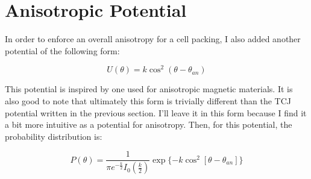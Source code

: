 \documentclass[12pt]{article}
\begin{document}
\section{Anisotropic Potential}
In order to enforce an overall anisotropy for a cell packing, I also added another potential of the following form:
\begin{center}
\begin{equation}
U(\theta) = k \cos^2(\theta - \theta_{an})
\end{equation}
\end{center}
This potential is inspired by one used for anisotropic magnetic materials. It is also good to note that ultimately this form is trivially different than the TCJ potential written in the previous section. I'll leave it in this form because I find it a bit more intuitive as a potential for anisotropy. Then, for this potential, the probability distribution is:
\begin{center}
\begin{equation}
P(\theta) = \frac{1}{\pi  e^{-\frac{k}{2}} I_0\left(\frac{k}{2}\right)} \exp\{- k\cos^2[\theta - \theta_{an}]\}
\end{equation}
\end{center}
\end{document}
